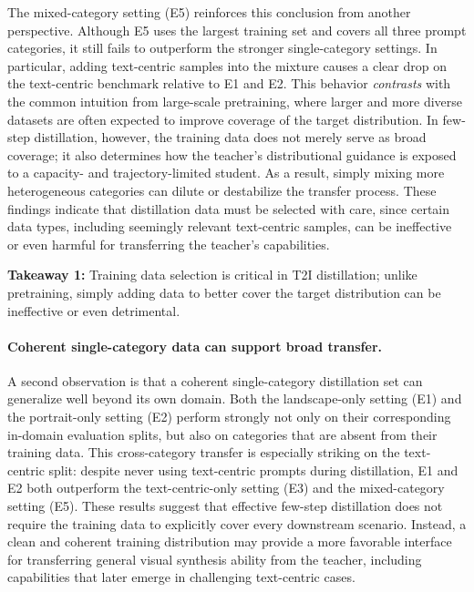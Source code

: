 \documentclass{llmxive}
\begin{document}
The mixed-category setting (E5) reinforces this conclusion from another perspective. Although E5 uses the largest training set and covers all three prompt categories, it still fails to outperform the stronger single-category settings. In particular, adding text-centric samples into the mixture causes a clear drop on the text-centric benchmark relative to E1 and E2. This behavior \textit{contrasts} with the common intuition from large-scale pretraining, where larger and more diverse datasets are often expected to improve coverage of the target distribution. In few-step distillation, however, the training data does not merely serve as broad coverage; it also determines how the teacher's distributional guidance is exposed to a capacity- and trajectory-limited student. As a result, simply mixing more heterogeneous categories can dilute or destabilize the transfer process. These findings indicate that distillation data must be selected with care, since certain data types, including seemingly relevant text-centric samples, can be ineffective or even harmful for transferring the teacher's capabilities.

\begin{tcolorbox}[
colback=blue!3,
colframe=blue!70!black,
boxrule=0.8pt,
arc=6pt,
left=6pt,
right=6pt,
top=4pt,
bottom=4pt
]
\textbf{Takeaway 1:} Training data selection is critical in T2I distillation; unlike pretraining, simply adding data to better cover the target distribution can be ineffective or even detrimental.
\end{tcolorbox}

\paragraph{Coherent single-category data can support broad transfer.}
A second observation is that a coherent single-category distillation set can generalize well beyond its own domain. Both the landscape-only setting (E1) and the portrait-only setting (E2) perform strongly not only on their corresponding in-domain evaluation splits, but also on categories that are absent from their training data. This cross-category transfer is especially striking on the text-centric split: despite never using text-centric prompts during distillation, E1 and E2 both outperform the text-centric-only setting (E3) and the mixed-category setting (E5). These results suggest that effective few-step distillation does not require the training data to explicitly cover every downstream scenario. Instead, a clean and coherent training distribution may provide a more favorable interface for transferring general visual synthesis ability from the teacher, including capabilities that later emerge in challenging text-centric cases.
\end{document}
